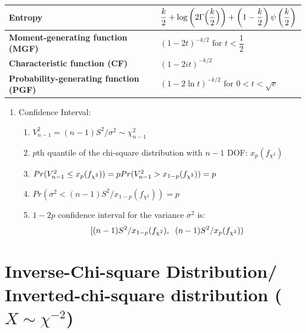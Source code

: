 \begin{customTableWrapper}{2}
\begin{longtable}{|m{6cm}|p{9cm}|}
    \textbf{Entropy} &
    ${ {{\dfrac {k}{2}} +\log \left(2\Gamma {\Bigl (}{\dfrac {k}{2}}{\Bigr )}\right)+\left(1-{\dfrac {k}{2}}\right)\psi \left({\dfrac {k}{2}}\right)}}$
    \\[1ex] \hline

    \textbf{Moment-generating function (MGF)} &
    ${ (1-2t)^{-k/2}{\text{ for }}t<{\dfrac {1}{2}}\;}$
    \\[1ex] \hline

    \textbf{Characteristic function (CF)} &
    ${ (1-2it)^{-k/2}}$
    \\[1ex] \hline

    \textbf{Probability-generating function (PGF)} &
    ${ (1-2\ln t)^{-k/2}{\text{ for }}0<t<{\sqrt {e}}\;}$
    \\[1ex] \hline

\end{longtable}
\end{customTableWrapper}

\begin{enumerate}[itemsep=0.2cm]
    \item Confidence Interval:
    \begin{enumerate}[itemsep=0.2cm]
        \item $V_{n-1}^2 = (n-1)S^2/\sigma^2 \sim \chi_{n-1}^2$

        \item $p$th quantile of the chi-square distribution with $n - 1$ DOF: $x_p(f_{\chi^2})$

        \item $
            \hfill
            Pr(V_{n-1}^2 \leq x_p(f_{\chi^2})) = p
            \hfill
            Pr(V_{n-1}^2 > x_{1-p}(f_{\chi^2})) = p
            \hfill
        $

        \item $
            Pr(\sigma^2 < (n-1)S^2/x_{1-p}(f_{\chi^2})) = p 
        $

        \item $1 - 2p$ confidence interval for the variance $\sigma^2$ is:
        \[[
            (n-1)S^2/x_{1-p}(f_{\chi^2}), 
            \hspace{0.2cm}
            (n-1)S^2/x_{p}(f_{\chi^2})
        )\]

    \end{enumerate}

\end{enumerate}



\section{Inverse-Chi-square Distribution/ Inverted-chi-square distribution ($X \sim \chi^{-2}$) \cite{wiki/Inverse-chi-squared_distribution}} \label{Inverse-Chi-square Distribution/ Inverted-chi-square distribution}



